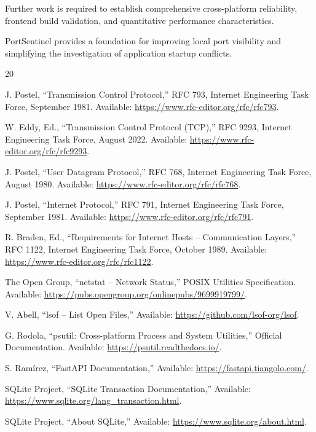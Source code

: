 \documentclass[conference]{IEEEtran}
\begin{document}
Further work is required to establish comprehensive
cross-platform reliability, frontend build validation,
and quantitative performance characteristics.

PortSentinel provides a foundation for improving
local port visibility and simplifying the
investigation of application startup conflicts.

\begin{thebibliography}{20}

J. Postel,
``Transmission Control Protocol,''
RFC 793, Internet Engineering Task Force,
September 1981.
Available: \url{https://www.rfc-editor.org/rfc/rfc793}.

W. Eddy, Ed.,
``Transmission Control Protocol (TCP),''
RFC 9293, Internet Engineering Task Force,
August 2022.
Available: \url{https://www.rfc-editor.org/rfc/rfc9293}.

J. Postel,
``User Datagram Protocol,''
RFC 768, Internet Engineering Task Force,
August 1980.
Available: \url{https://www.rfc-editor.org/rfc/rfc768}.

J. Postel,
``Internet Protocol,''
RFC 791, Internet Engineering Task Force,
September 1981.
Available: \url{https://www.rfc-editor.org/rfc/rfc791}.

R. Braden, Ed.,
``Requirements for Internet Hosts -- Communication Layers,''
RFC 1122, Internet Engineering Task Force,
October 1989.
Available: \url{https://www.rfc-editor.org/rfc/rfc1122}.

The Open Group,
``netstat -- Network Status,''
POSIX Utilities Specification.
Available: \url{https://pubs.opengroup.org/onlinepubs/9699919799/}.

V. Abell,
``lsof -- List Open Files,''
Available: \url{https://github.com/lsof-org/lsof}.

G. Rodola,
``psutil: Cross-platform Process and System Utilities,''
Official Documentation.
Available: \url{https://psutil.readthedocs.io/}.

S. Ramírez,
``FastAPI Documentation,''
Available: \url{https://fastapi.tiangolo.com/}.

SQLite Project,
``SQLite Transaction Documentation,''
Available: \url{https://www.sqlite.org/lang_transaction.html}.

SQLite Project,
``About SQLite,''
Available: \url{https://www.sqlite.org/about.html}.


\end{thebibliography}
\end{document}
